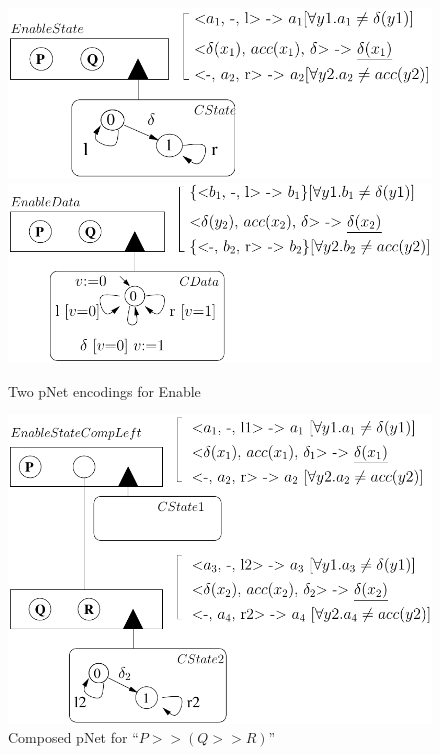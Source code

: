 \documentclass[smallcondensed]{svjour3}
\begin{document}
\begin{figure}[t]
\begin{minipage}{6.1cm}

  \includegraphics[width=\linewidth]{ActaXFIG/Enable1}
  \\[1.3ex]
 \includegraphics[width=\linewidth]{ActaXFIG/Enable2}
  \caption{Two pNet encodings for  Enable }  \label{schema:enable-pnets}
\end{minipage}
  \hspace{2mm}
\begin{minipage}{6cm}
  \includegraphics[width=\linewidth]{ActaXFIG/P-QR}
  \caption{Composed pNet for ``$P>>(Q>>R)$''}  \label{schema:enable-composed}
\end{minipage}

\end{figure}
\end{document}
